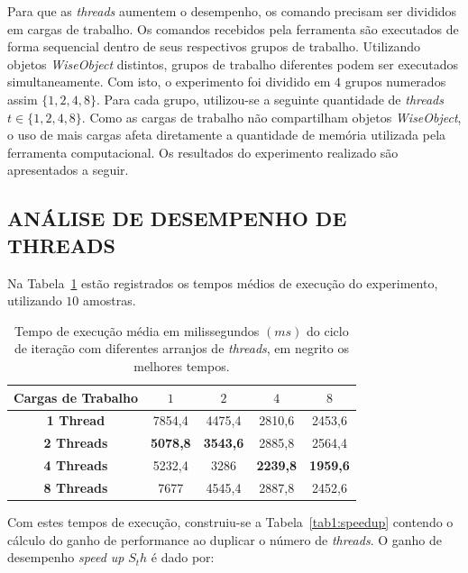 Para que as \textit{threads} aumentem o desempenho, os comando precisam ser divididos em cargas de trabalho. Os comandos recebidos pela ferramenta são executados de forma sequencial dentro de seus respectivos grupos de trabalho. Utilizando objetos \textit{WiseObject} distintos, grupos de trabalho diferentes podem ser executados simultaneamente. Com isto, o experimento foi dividido em $4$ grupos numerados assim $\{1,2,4,8\}$. Para cada grupo, utilizou-se a seguinte quantidade de \textit{threads} $t \in \{1,2,4,8\}$. Como as cargas de trabalho não compartilham objetos \textit{WiseObject}, o uso de mais cargas afeta diretamente a quantidade de memória utilizada pela ferramenta computacional. Os resultados do experimento realizado são apresentados a seguir.


\subsection{ANÁLISE DE DESEMPENHO DE THREADS}\label{sec:cenario4}

Na Tabela~\ref{tab1:medium} estão registrados os tempos médios de execução do experimento, utilizando $10$ amostras.

\begin{table}[!htbp]
	\caption{Tempo de execução média em milissegundos $(ms)$ do ciclo de iteração com diferentes arranjos de \textit{threads}, em negrito os melhores tempos.}
	\centering{}
	\begin{tabular}{c|c|c|c|c}
		\toprule 
		\textbf{Cargas de Trabalho}	& $1$ & $2$ & $4$  & $8$\\ 
		\midrule 
		\textbf{1 Thread} & 7854,4 &	4475,4 &	2810,6 &	2453,6\\ 
		\midrule 
		\textbf{2 Threads} & \textbf{5078,8} &	\textbf{3543,6} &	2885,8 &	2564,4\\ 
		\midrule 
		\textbf{4 Threads} & 5232,4 &	3286 &	\textbf{2239,8} &	\textbf{1959,6}\\ 
		\midrule 
		\textbf{8 Threads} & 7677 &	4545,4 &	2887,8 &	2452,6
		
		\\ 
		\bottomrule 
	\end{tabular} 
	\label{tab1:medium}
\end{table}

Com estes tempos de execução, construiu-se a Tabela~\ref{tab1:speedup} contendo o cálculo do ganho de performance ao duplicar o número de \textit{threads}. O ganho de desempenho \textit{speed up} $S_th$ é dado por:

